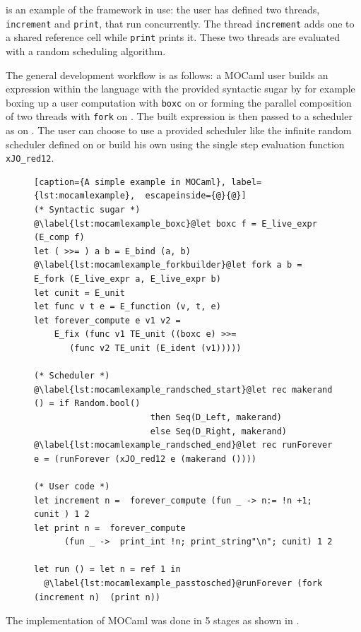 \documentclass[12pt,twoside,notitlepage]{report}
\theoremstyle{plain}%
\theoremstyle{definition}
\theoremstyle{remark}
\begin{document}
 is an example of the framework in use:  the user has defined two threads, \lstinline|increment| and \lstinline|print|, that run concurrently. The thread  \lstinline|increment| adds one to a shared reference cell while \lstinline|print| prints it. These two threads are evaluated with a random scheduling algorithm.

The general development workflow is as follows: a MOCaml user builds an expression within the language with the provided syntactic sugar by for example boxing up a user computation with \lstinline|boxc| on  or forming the parallel composition of two threads with \lstinline|fork| on . The built expression is then passed to a scheduler as on . The user can choose to use a provided scheduler like the infinite random scheduler defined on  or build his own using the single step evaluation function \lstinline|xJO_red12|.
\begin{figure}[H]
\centering
\begin{lstlisting}[caption={A simple example in MOCaml}, label={lst:mocamlexample},  escapeinside={@}{@}]
(* Syntactic sugar *)
@\label{lst:mocamlexample_boxc}@let boxc f = E_live_expr (E_comp f)
let ( >>= ) a b = E_bind (a, b)
@\label{lst:mocamlexample_forkbuilder}@let fork a b = E_fork (E_live_expr a, E_live_expr b)
let cunit = E_unit
let func v t e = E_function (v, t, e)
let forever_compute e v1 v2 = 
    E_fix (func v1 TE_unit ((boxc e) >>= 
       (func v2 TE_unit (E_ident (v1)))))

(* Scheduler *)
@\label{lst:mocamlexample_randsched_start}@let rec makerand () = if Random.bool() 
                       then Seq(D_Left, makerand) 
                       else Seq(D_Right, makerand)
@\label{lst:mocamlexample_randsched_end}@let rec runForever e = (runForever (xJO_red12 e (makerand ())))

(* User code *)
let increment n =  forever_compute (fun _ -> n:= !n +1; cunit ) 1 2
let print n =  forever_compute 
      (fun _ ->  print_int !n; print_string"\n"; cunit) 1 2 

let run () = let n = ref 1 in
  @\label{lst:mocamlexample_passtosched}@runForever (fork (increment n)  (print n))
\end{lstlisting}
\end{figure}

The implementation of MOCaml was done in 5 stages as shown in . \label{sec:detailed_impl}
\end{document}
